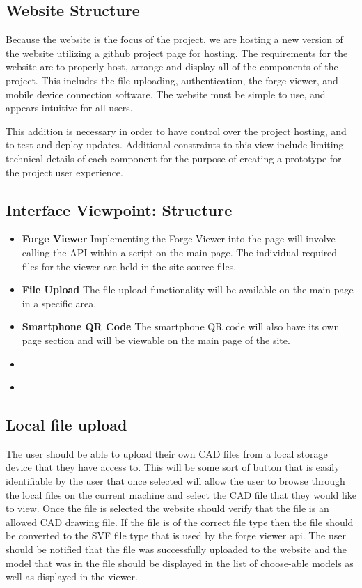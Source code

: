 \documentclass[letterpaper, 10pt, draftclsnofoot, compsoc, onecolumn]{IEEEtran}
\begin{document}
\subsection{Website Structure}
Because the website is the focus of the project, we are hosting a new version of the website utilizing a github project page for hosting. The requirements for the website are to properly host, arrange and display all of the components of the project. This includes the file uploading, authentication, the forge viewer, and mobile device connection software. The website must be simple to use, and appears intuitive for all users.

This addition is necessary in order to have control over the project hosting, and to test and deploy updates. Additional constraints to this view include limiting technical details of each component for the purpose of creating a prototype for the project user experience. 

\subsection{Interface Viewpoint: Structure}
\begin{itemize}
	\item[]\textbf{Forge Viewer} Implementing the Forge Viewer into the page will involve calling the API within a script on the main page. The individual required files for the viewer are held in the site source files.
	\item[]\textbf{File Upload} The file upload functionality will be available on the main page in a specific area.
	\item[]\textbf{Smartphone QR Code}  The smartphone QR code will also have its own page section and will be viewable on the main page of the site.
	\item[]\textbf{}
	\item[]\textbf{} 
\end{itemize}

\subsection{Local file upload}
	The user should be able to upload their own CAD files from a local storage device that they have access to. This will be some sort of button that is easily identifiable by the user that once selected will allow the user to browse through the local files on the current machine and select the CAD file that they would like to view. Once the file is selected the website should verify that the file is an allowed CAD drawing file. If the file is of the correct file type then the file should be converted to the SVF file type that is used by the forge viewer api. The user should be notified that the file was successfully uploaded to the website and the model that was in the file should be displayed in the list of choose-able models as well as displayed in the viewer. 
\end{document}
